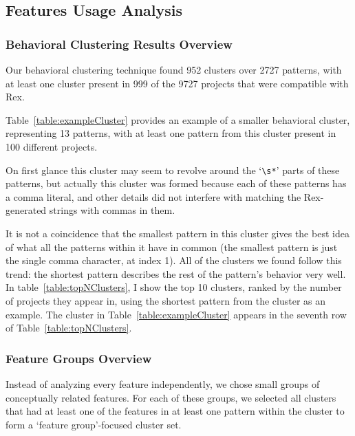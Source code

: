 

\subsection{Features Usage Analysis}
\subsubsection{Behavioral Clustering Results Overview}


Our behavioral clustering technique found 952 clusters over 2727 patterns, with at least one cluster present in 999 of the 9727 projects that were compatible with Rex.


Table~\ref{table:exampleCluster} provides an example of a smaller behavioral cluster, representing 13 patterns, with at least one pattern from this cluster present in 100 different projects.

On first glance this cluster may seem to revolve around the `\verb!\s*!' parts of these patterns, but actually this cluster was formed because each of these patterns has a comma literal, and other details did not interfere with matching the Rex-generated strings with commas in them.

It is not a coincidence that the smallest pattern in this cluster gives the best idea of what all the patterns within it have in common (the smallest pattern is just the single comma character, at index 1).  All of the clusters we found follow this trend: the shortest pattern describes the rest of the pattern's behavior very well.  In table~\ref{table:topNClusters}, I show the top 10 clusters, ranked by the number of projects they appear in, using the shortest pattern from the cluster as an example.
The cluster in Table~\ref{table:exampleCluster} appears in the seventh row of Table~\ref{table:topNClusters}.



\subsubsection{Feature Groups Overview}
Instead of analyzing every feature independently, we chose small groups of conceptually related features.  For each of these groups, we selected all clusters that had at least one of the features in at least one pattern within the cluster to form a `feature group'-focused cluster set.

